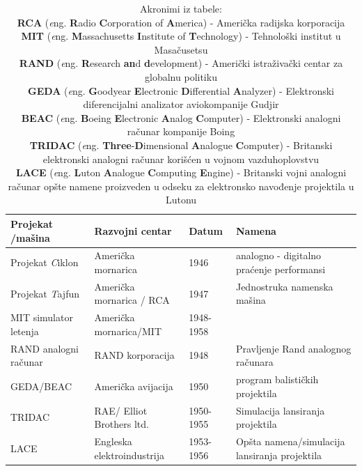 \documentclass[a4paper]{article}
\begin{document}
		\begin{table}[h!]
			\begin{center}
				\begin{tabular}{| m{2cm} | m{4cm} | m{1cm} | m{4cm} |}
					\hline
					Projekat /mašina & Razvojni centar & Datum & Namena \\
					\hline
					Projekat \emph Ciklon & Američka mornarica & 1946 & analogno - digitalno praćenje performansi \\
					\hline
					Projekat \emph Tajfun & Američka mornarica / RCA & 1947 & Jednostruka namenska mašina \\
					\hline
					MIT simulator letenja & Američka mornarica/MIT & 1948- 1958 & \\
					\hline
					RAND analogni računar & RAND korporacija & 1948 & Pravljenje Rand analognog računara \\
					\hline
					GEDA/BEAC &  Američka avijacija & 1950 & program balističkih projektila \\
					\hline
					TRIDAC & RAE/ Elliot Brothers ltd. & 1950- 1955 & Simulacija lansiranja projektila \\
					\hline
					LACE & Engleska elektroindustrija & 1953- 1956 & Opšta namena/simulacija lansiranja projektila \\ 
					\hline
				\end{tabular}
				\label{tab:tableEAR}
				\caption{
						Akronimi iz tabele: \\
						\textbf{RCA} (\textit eng. \textbf Radio \textbf Corporation of \textbf America) - Američka radijska korporacija \\
						\textbf{MIT} (\textit eng. \textbf Massachusetts \textbf Institute of \textbf Technology) - Tehnološki institut u Masačusetsu  \\
						\textbf{RAND} (\textit eng. \textbf Research \textbf{an}d \textbf development) - Američki istraživački centar za globalnu politiku \\
						\textbf{GEDA} (\textit eng. \textbf Goodyear \textbf Electronic \textbf Differential \textbf Analyzer) - Elektronski diferencijalni analizator aviokompanije Gudjir \\
						\textbf{BEAC} (\textit eng. \textbf Boeing \textbf Electronic \textbf Analog \textbf Computer) - Elektronski analogni računar kompanije Boing \\
						\textbf{TRIDAC} (\textit eng. \textbf {Three}-\textbf Dimensional \textbf Analogue \textbf Computer) - Britanski elektronski analogni računar korišćen u vojnom vazduhoplovstvu \\
						\textbf{LACE} (\textit eng. \textbf Luton \textbf Analogue \textbf Computing \textbf Engine) - Britanski vojni analogni računar opšte namene proizveden u odseku za elektronsko navođenje projektila u Lutonu 
						}
			\end{center}
		\end{table}
\end{document}
